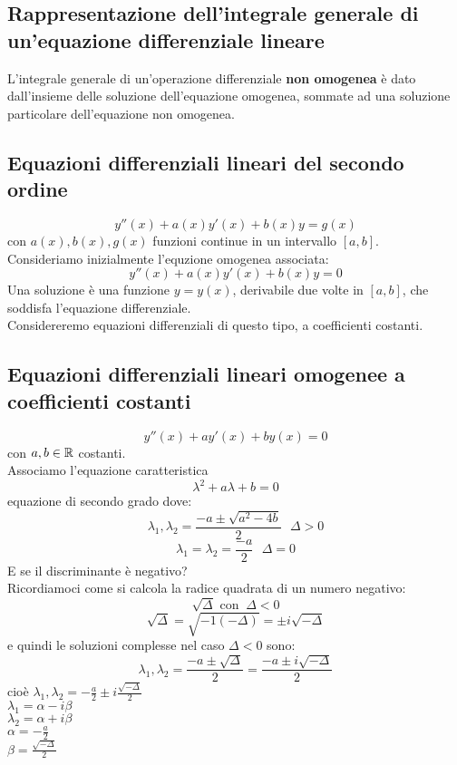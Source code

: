 \documentclass[../../main.tex]{subfiles}
\begin{document}
\subsection{Rappresentazione dell'integrale generale di un'equazione differenziale lineare}
L'integrale generale di un'operazione differenziale \textbf{non omogenea} è
dato dall'insieme delle soluzione dell'equazione omogenea, sommate ad una
soluzione particolare dell'equazione non omogenea.

\subsection{Equazioni differenziali lineari del secondo ordine}
\[
    y''(x) + a(x)y'(x) + b(x)y = g(x)
\]
con $a(x), b(x), g(x)$ funzioni continue in un intervallo $[a, b]$. \\
Consideriamo inizialmente l'equzione omogenea associata:
\[
    y''(x) + a(x)y'(x) + b(x)y = 0
\]
Una soluzione è una funzione $y = y(x)$, derivabile due volte in $[a, b]$, che
soddisfa l'equazione differenziale.\\ Considereremo equazioni differenziali di
questo tipo, a coefficienti costanti.

\subsection{Equazioni differenziali lineari omogenee a coefficienti costanti}
\[
    y''(x) + ay'(x) + by(x) = 0
\]
con $a, b \in \mathbb{R}$ costanti.\\ Associamo l'equazione caratteristica
\[
    \lambda^2 + a\lambda + b = 0
\]
equazione di secondo grado dove:
\[
    \lambda_1, \lambda_2 = \frac{-a \pm \sqrt{a^2 - 4b}}{2} \ \ \ \Delta > 0
\]
\[
    \lambda_1 = \lambda_2 = \frac{-a}{2} \ \ \ \Delta = 0
\]
E se il discriminante è negativo? \\ Ricordiamoci come si calcola la radice
quadrata di un numero negativo:
\[
    \sqrt{\Delta} \text{ con } \ \Delta < 0
\]
\[
    \sqrt{\Delta} = \sqrt{-1(-\Delta)} = \pm i\sqrt{-\Delta}
\]
e quindi le soluzioni complesse nel caso $\Delta < 0$ sono:
\[
    \lambda_1, \lambda_2 = \frac{-a \pm \sqrt{\Delta}}{2} = \frac{-a\pm i\sqrt{-\Delta}}{2}
\]
cioè $\lambda_1, \lambda_2 = -\frac{a}{2}\pm i \frac{\sqrt{-\Delta}}{2}$\\
$\lambda_1 = \alpha - i\beta$\\ $\lambda_2 = \alpha + i\beta$\\ $\alpha =
    -\frac{a}{2}$\\ $\beta = \frac{\sqrt{-\Delta}}{2}$
\end{document}
